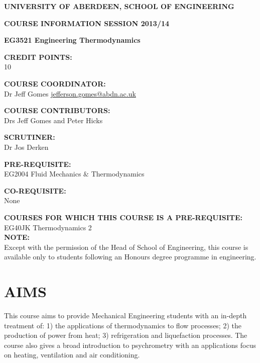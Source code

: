 \documentclass[12pts,a4paper,amsmath,amssymb,floatfix]{article}%
\begin{document}
\begin{center}
{\large {\bf UNIVERSITY OF ABERDEEN, SCHOOL OF ENGINEERING}}
\medskip

{\large {\bf COURSE INFORMATION SESSION 2013/14}}
\bigskip 

{\Large {\bf EG3521 Engineering Thermodynamics}}
\end{center}

\bigskip
\begin{flushleft}

{\large {\bf CREDIT POINTS:}}\\
\hspace{0.8cm}10
\medskip

{\large {\bf COURSE COORDINATOR: }}\\
\hspace{0.8cm}Dr Jeff Gomes \hspace{1.5cm} \href{mailto:jefferson.gomes@abdn.ac.uk}{jefferson.gomes@abdn.ac.uk}
\medskip 

{\large {\bf COURSE CONTRIBUTORS:}}\\
\hspace{0.8cm} Drs Jeff Gomes and Peter Hicks
\medskip

{\large {\bf SCRUTINER:}}\\
\hspace{0.8cm}Dr Jos Derken
\medskip  

{\large {\bf PRE-REQUISITE:}}\\
\hspace{0.8cm}EG2004 Fluid Mechanics $\&$ Thermodynamics
\medskip

{\large {\bf CO-REQUISITE:}}\\
\hspace{0.8cm}None
\medskip 

{\large {\bf COURSES FOR WHICH THIS COURSE IS A PRE-REQUISITE:}}\\
\hspace{0.8cm}EG40JK Thermodynamics 2\\ 

\medskip
{\large {\bf NOTE:}}\\
Except with the permission of the Head of School of Engineering, this course is available only to students following an Honours degree programme in engineering.

\end{flushleft}


\clearpage

\section{AIMS}
This course aims to provide Mechanical Engineering students with an in-depth treatment of: 1) the applications of thermodynamics to flow processes; 2) the production of power from heat; 3) refrigeration and liquefaction processes. The course also gives a broad introduction to psychrometry with an applications focus on heating, ventilation and air conditioning.
\end{document}
